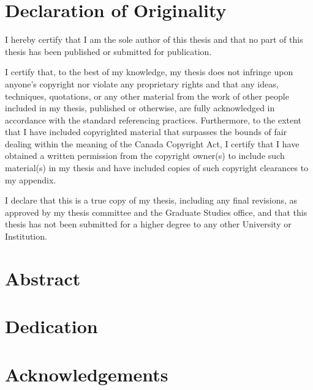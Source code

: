 \documentclass[12pt,letterpaper,oneside]{report}
\begin{document}
\chapter*{Declaration of Originality} %
I hereby certify that I am the sole author of this thesis and that no part of this thesis has been published or submitted for publication. \par I certify that, to the best of my knowledge, my thesis does not infringe upon anyone’s copyright nor violate any proprietary rights and that any ideas, techniques, quotations, or any other material from the work of other people included in my thesis, published or otherwise, are fully acknowledged in accordance with the standard referencing practices. Furthermore, to the extent that I have included copyrighted material that surpasses the bounds of fair dealing within the meaning of the Canada Copyright Act, I certify that I have obtained a written permission from the copyright owner(s) to include such material(s) in my thesis and have included copies of such copyright clearances to my appendix. \par I declare that this is a true copy of my thesis, including any final revisions, as approved by my thesis committee and the Graduate Studies office, and that this thesis has not been submitted for a higher degree to any other University or Institution.


\chapter*{Abstract} %
\blindtext \blindtext \blindtext %


\chapter*{Dedication}


\chapter*{Acknowledgements}


\tableofcontents
\listoftables
{} %
\listoffigures
{} %
\end{document}
